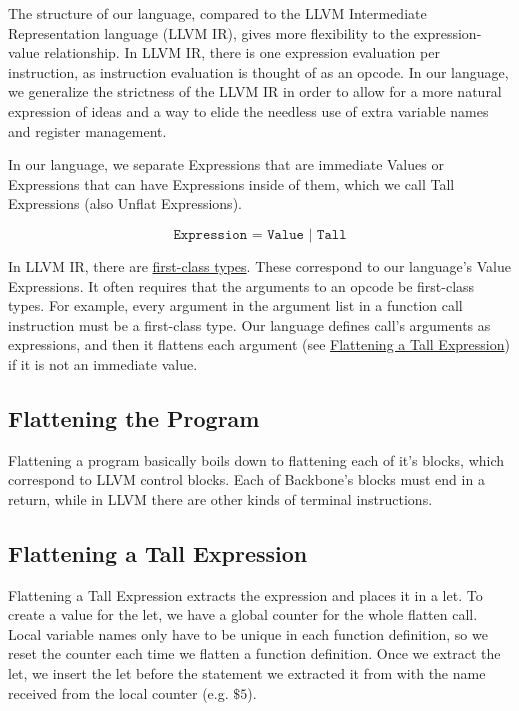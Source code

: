 \documentclass[journal=jacsat, manuscript=article]{achemso}
\begin{document}
The structure of our language, compared to the LLVM Intermediate Representation language
(LLVM IR), gives more flexibility to the expression-value relationship. In LLVM IR,
there is one expression evaluation per instruction, as instruction evaluation is
thought of as an opcode. In our language, we generalize the strictness of the LLVM IR
in order to allow for a more natural expression of ideas and a way to elide the needless
use of extra variable names and register management.

In our language, we separate Expressions that are immediate Values or Expressions that
can have Expressions inside of them, which we call Tall Expressions (also Unflat Expressions).

$$\texttt{Expression = Value | Tall}$$

In LLVM IR, there are
\href{https://llvm.org/docs/LangRef.html#first-class-types}{first-class types}.
These correspond to our language's Value Expressions. It often requires that the arguments
to an opcode be first-class types. For example, every argument in the argument list in a
function call instruction must be a first-class type. Our language defines call's arguments
as expressions, and then it flattens each argument (see \hyperref[sec:Flattening a Tall Expression]{Flattening a Tall Expression})
if it is not an immediate value.

\subsection{Flattening the Program}

Flattening a program basically boils down to flattening each of it's blocks, which
correspond to LLVM control blocks. Each of Backbone's blocks must end in a return, while
in LLVM there are other kinds of terminal instructions.

\subsection{Flattening a Tall Expression}

Flattening a Tall Expression extracts the expression and places it in a let. To create a
value for the let, we have a global counter for the whole flatten call. Local variable
names only have to be unique in each function definition, so we reset the counter each
time we flatten a function definition. Once we extract the let, we insert the let before
the statement we extracted it from with the name received from the local counter (e.g. $\$5$).
\end{document}
